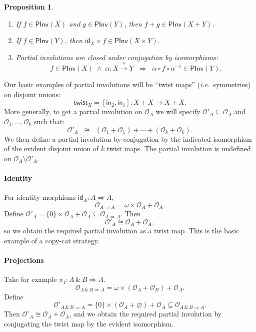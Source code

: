 \documentclass[a4paper,11pt]{article}
\newtheorem{proposition}{Proposition}[section]
\newcommand{\llwith}{\, \& \,}
\newcommand{\Occ}{\mathcal{O}}
\newcommand{\PInv}[1]{\mathsf{PInv}(#1)}
\newcommand{\twist}{\mathsf{twist}}
\newcommand{\ident}{\mathsf{id}}
\newcommand{\ie}{\textit{i.e.}\ }
\begin{document}
\begin{proposition}
\begin{enumerate}
\item If $f \in \PInv{X}$ and $g \in \PInv{Y}$, then $f + g \in
  \PInv{X+Y}$.
\item If $f \in \PInv{Y}$, then $\ident_X \times f \in \PInv{X \times
    Y}$.
\item Partial involutions are closed under conjugation by
  isomorphisms:
\[ f \in \PInv{X} \; \wedge \; \alpha : X
  \stackrel{\cong}{\longrightarrow} Y \;\; \Longrightarrow \;\;
\alpha \circ f \circ \alpha^{-1} \in \PInv{Y} . \]
\end{enumerate}
\end{proposition}
Our basic examples of partial involutions will be
``twist maps'' (\ie symmetries) on
disjoint unions:
\[ \twist_X = [ \mathsf{in}_2 , \mathsf{in}_1 ] : X + X \longrightarrow X + X . \]
More generally, to get a partial involution on $\Occ_A$ we will
specify $\Occ'_A \subseteq \Occ_A$ and $\Occ_1, \ldots , \Occ_k$ such
that:
\[ \Occ'_A \;\; \cong \;\; (\Occ_1 + \Occ_1 ) +
\cdots + (\Occ_k + \Occ_k ) . \]
We then define a partial involution by conjugation by the indicated
isomorphism  of the evident disjoint union of $k$ twist maps. The partial involution is undefined on
$\Occ_A \setminus \Occ'_A$.


\paragraph{Identity}
For identity morphisms $\ident_A : A \Rightarrow A$,
\[ \Occ_{A \Rightarrow A} = \omega \times \Occ_A + \Occ_A . \]
Define $\Occ'_A = \{ 0 \} \times \Occ_A + \Occ_A \subseteq \Occ_{A
  \Rightarrow A}$.
Then
\[ \Occ'_A \cong \Occ_A + \Occ_A , \]
so we obtain the required partial involution as a twist map. This is
the basic example of a copy-cat strategy.

\paragraph{Projections}
Take for example $\pi_1 : A \llwith B \Rightarrow A$.
\[ \Occ_{A \llwith B \Rightarrow A} = \omega \times (\Occ_A + \Occ_B )
+ \Occ_A . \]
Define
\[ \Occ'_{A \llwith B \Rightarrow A} = \{ 0 \} \times (\Occ_A + \varnothing )
+ \Occ_A \subseteq \Occ_{A \llwith B \Rightarrow A}  . \]
Then $\Occ'_A \cong \Occ_A + \Occ_A$, and we obtain the required
partial involution by conjugating the twist map by the evident
isomorphism.
\end{document}
